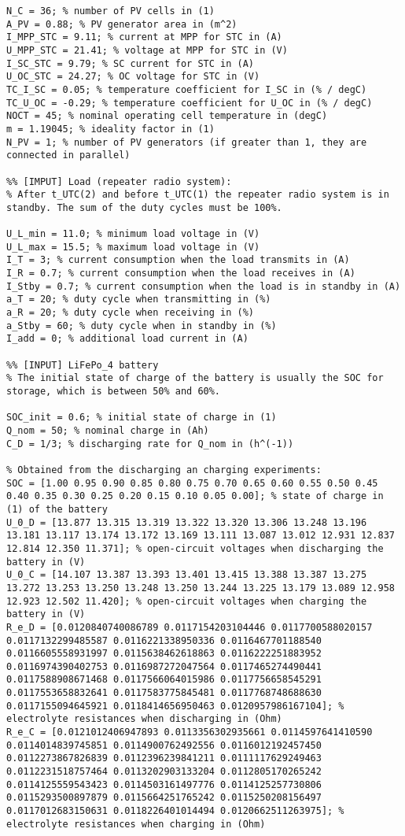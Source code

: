 \begin{lstlisting}
N_C = 36; % number of PV cells in (1)
A_PV = 0.88; % PV generator area in (m^2)
I_MPP_STC = 9.11; % current at MPP for STC in (A)
U_MPP_STC = 21.41; % voltage at MPP for STC in (V)
I_SC_STC = 9.79; % SC current for STC in (A)
U_OC_STC = 24.27; % OC voltage for STC in (V)
TC_I_SC = 0.05; % temperature coefficient for I_SC in (% / degC)
TC_U_OC = -0.29; % temperature coefficient for U_OC in (% / degC)
NOCT = 45; % nominal operating cell temperature in (degC)
m = 1.19045; % ideality factor in (1)
N_PV = 1; % number of PV generators (if greater than 1, they are connected in parallel)

%% [IMPUT] Load (repeater radio system):
% After t_UTC(2) and before t_UTC(1) the repeater radio system is in standby. The sum of the duty cycles must be 100%.

U_L_min = 11.0; % minimum load voltage in (V)
U_L_max = 15.5; % maximum load voltage in (V)
I_T = 3; % current consumption when the load transmits in (A)
I_R = 0.7; % current consumption when the load receives in (A)
I_Stby = 0.7; % current consumption when the load is in standby in (A)
a_T = 20; % duty cycle when transmitting in (%) 
a_R = 20; % duty cycle when receiving in (%)
a_Stby = 60; % duty cycle when in standby in (%)
I_add = 0; % additional load current in (A)

%% [INPUT] LiFePo_4 battery
% The initial state of charge of the battery is usually the SOC for storage, which is between 50% and 60%.

SOC_init = 0.6; % initial state of charge in (1)
Q_nom = 50; % nominal charge in (Ah)
C_D = 1/3; % discharging rate for Q_nom in (h^(-1))

% Obtained from the discharging an charging experiments:
SOC = [1.00 0.95 0.90 0.85 0.80 0.75 0.70 0.65 0.60 0.55 0.50 0.45 0.40 0.35 0.30 0.25 0.20 0.15 0.10 0.05 0.00]; % state of charge in (1) of the battery
U_0_D = [13.877 13.315 13.319 13.322 13.320 13.306 13.248 13.196 13.181 13.117 13.174 13.172 13.169 13.111 13.087 13.012 12.931 12.837 12.814 12.350 11.371]; % open-circuit voltages when discharging the battery in (V)
U_0_C = [14.107 13.387 13.393 13.401 13.415 13.388 13.387 13.275 13.272 13.253 13.250 13.248 13.250 13.244 13.225 13.179 13.089 12.958 12.923 12.502 11.420]; % open-circuit voltages when charging the battery in (V)
R_e_D = [0.0120840740086789 0.0117154203104446 0.0117700588020157 0.0117132299485587 0.0116221338950336 0.0116467701188540 0.0116605558931997 0.0115638462618863 0.0116222251883952 0.0116974390402753 0.0116987272047564 0.0117465274490441 0.0117588908671468 0.0117566064015986 0.0117756658545291 0.0117553658832641 0.0117583775845481 0.0117768748688630 0.0117155094645921 0.0118414656950463 0.0120957986167104]; % electrolyte resistances when discharging in (Ohm)
R_e_C = [0.0121012406947893 0.0113356302935661 0.0114597641410590 0.0114014839745851 0.0114900762492556 0.0116012192457450 0.0112273867826839 0.0112396239841211 0.0111117629249463 0.0112231518757464 0.0113202903133204 0.0112805170265242 0.0114125559543423 0.0114503161497776 0.0114125257730806 0.0115293500897879 0.0115664251765242 0.0115250208156497 0.0117012683150631 0.0118226401014494 0.0120662511263975]; % electrolyte resistances when charging in (Ohm)


\end{lstlisting}

